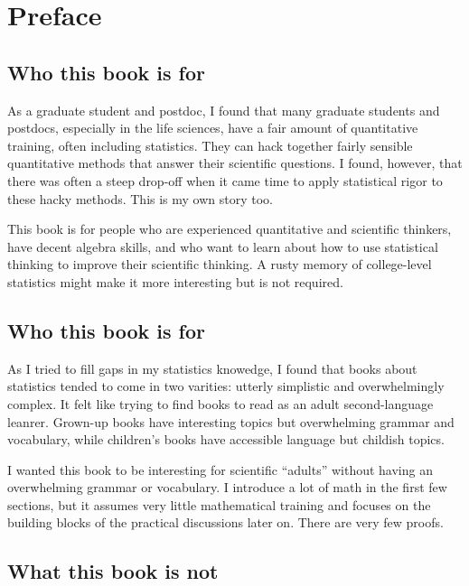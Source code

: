 
\chapter{Preface}

\section*{Who this book is for}

As a graduate student and postdoc, I found that many graduate
students and postdocs, especially in the life sciences, have a fair amount of quantitative
training, often including statistics. They can hack together
fairly sensible quantitative methods that answer their scientific questions. I
found, however, that there was often a steep drop-off when it came time to apply
statistical rigor to these hacky methods. This is my
own story too.

This book is for people who are experienced quantitative and scientific
thinkers, have decent algebra skills, and who want to learn
about how to use statistical thinking to improve their scientific thinking.
A rusty memory of college-level statistics might make it more interesting
but is not required.

\section*{Who this book is for}

As I tried to fill gaps in my statistics knowedge, I found that books about
statistics tended to come in two varities: utterly simplistic and
overwhelmingly complex. It felt like trying to find books to read as an
adult second-language leanrer.
Grown-up books have interesting topics but overwhelming grammar and vocabulary,
while children's books have accessible language but childish topics.

I wanted this book to be interesting for scientific ``adults'' without having
an overwhelming grammar or vocabulary. I introduce a lot of math in the first
few sections, but it assumes very little mathematical training and focuses on
the building blocks of the practical discussions later on. There are very few
proofs.

\section*{What this book is not}

